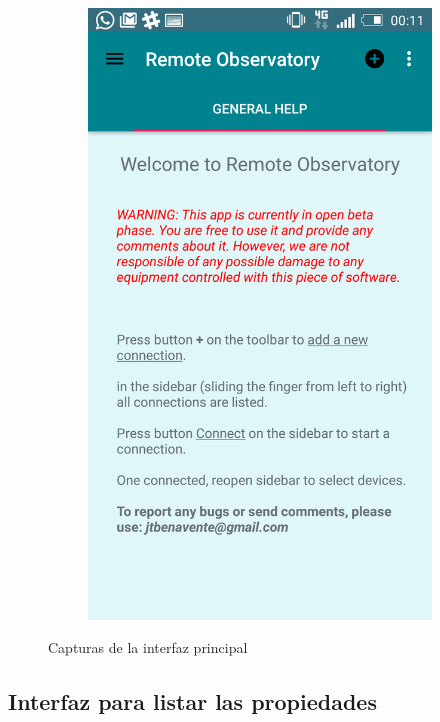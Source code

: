 \begin{figure}
\begin{subfigure}[]{0.4\textwidth}
        \includegraphics[width=\textwidth]{../images/captura9.png}
        \caption{}
        \label{fig:captura7}
    \end{subfigure}
    \caption{Capturas de la interfaz principal}\label{fig:capturas4}
\end{figure}


\bigskip
\subsection{Interfaz para listar las propiedades}

